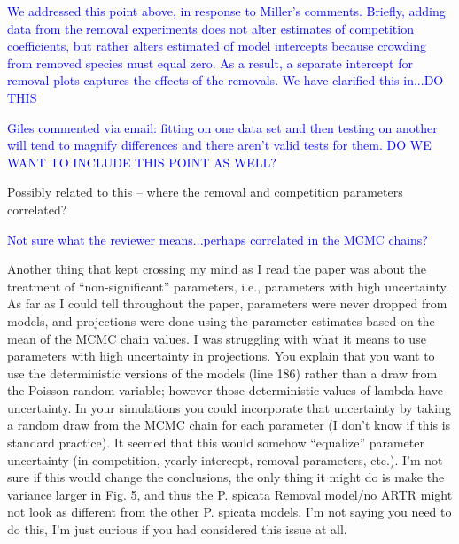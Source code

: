 \documentclass[12pt]{article}
\newcommand{\response}{\textcolor{blue}}
\begin{document}
\response{We addressed this point above, in response to Miller's comments. Briefly, adding data from the removal experiments does not alter estimates of competition coefficients, but rather alters estimated of model intercepts because crowding from removed species must equal zero. As a result, a separate intercept for removal plots captures the effects of the removals. We have clarified this in...DO THIS}

\response{Giles commented via email: fitting on one data set and then testing on another will tend to magnify differences and there aren’t valid tests for them. DO WE WANT TO INCLUDE THIS POINT AS WELL? }

Possibly related to this – where the removal and competition parameters correlated?

\response{Not sure what the reviewer means...perhaps correlated in the MCMC chains?}

Another thing that kept crossing my mind as I read the paper was about the treatment of “non-significant” parameters, i.e., parameters with high uncertainty. As far as I could tell throughout the paper, parameters were never dropped from models, and projections were done using the parameter estimates based on the mean of the MCMC chain values. I was struggling with what it means to use parameters with high uncertainty in projections. You explain that you want to use the deterministic versions of the models (line 186) rather than a draw from the Poisson random variable; however those deterministic values of lambda have uncertainty. In your simulations you could incorporate that uncertainty by taking a random draw from the MCMC chain for each parameter (I don't know if this is standard practice). It seemed that this would somehow “equalize” parameter uncertainty (in competition, yearly intercept, removal parameters, etc.). I’m not sure if this would change the conclusions, the only thing it might do is make the variance larger in Fig. 5, and thus the P. spicata Removal model/no ARTR might not look as different from the other P. spicata models. I’m not saying you need to do this, I’m just curious if you had considered this issue at all.
\end{document}

